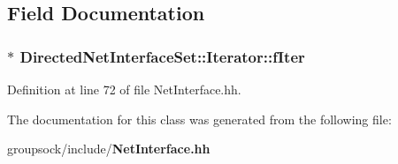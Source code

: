 \subsection{Field Documentation}
\subsubsection[{f\+Iter}]{$\ast$ Directed\+Net\+Interface\+Set\+::\+Iterator\+::f\+Iter\hspace{0.3cm}{\ttfamily [private]}}\label{classDirectedNetInterfaceSet_1_1Iterator_a2bf6ee225588ab6a345624c9018573be}


Definition at line 72 of file Net\+Interface.\+hh.



The documentation for this class was generated from the following file\+:\begin{DoxyCompactItemize}
\item 
groupsock/include/{\bf Net\+Interface.\+hh}\end{DoxyCompactItemize}
